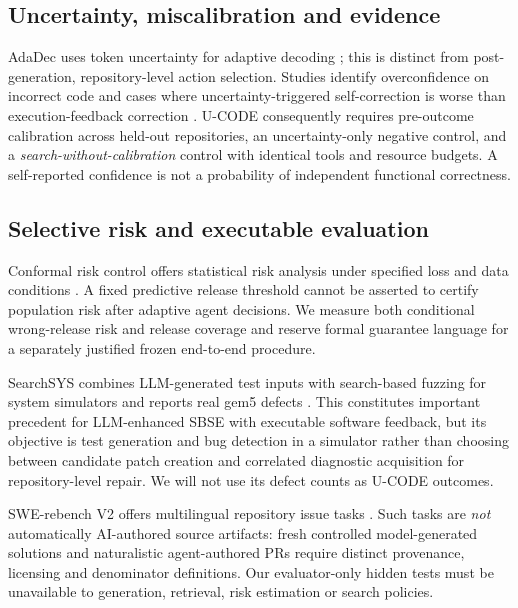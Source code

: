 \documentclass[pdflatex,sn-basic]{sn-jnl}
\begin{document}
\subsection{Uncertainty, miscalibration and evidence}
AdaDec uses token uncertainty for adaptive decoding
\cite{he2025adadec}; this is distinct from post-generation,
repository-level action selection. Studies identify overconfidence
on incorrect code \cite{rathnasuriya2026overconfidence} and
cases where uncertainty-triggered self-correction is worse than
execution-feedback correction \cite{rakasi2026uncertainty}.
U-CODE consequently requires pre-outcome calibration across held-out
repositories, an uncertainty-only negative control, and a
\emph{search-without-calibration} control with identical tools and
resource budgets. A self-reported confidence is not a probability
of independent functional correctness.

\subsection{Selective risk and executable evaluation}
Conformal risk control offers statistical risk analysis under
specified loss and data conditions \cite{angelopoulos2024crc}.
A fixed predictive release threshold cannot be asserted to
certify population risk after adaptive agent decisions. We measure
both conditional wrong-release risk and release coverage and reserve
formal guarantee language for a separately justified frozen
end-to-end procedure.

SearchSYS combines LLM-generated test inputs with
search-based fuzzing for system simulators and reports real
gem5 defects \cite{dakhama2025searchsys}. This constitutes
important precedent for LLM-enhanced SBSE with executable
software feedback, but its objective is test generation and
bug detection in a simulator rather than choosing
between candidate patch creation and correlated
diagnostic acquisition for repository-level repair.
We will not use its defect counts as U-CODE outcomes.

SWE-rebench V2 offers multilingual repository issue tasks
\cite{badertdinov2026swerebench}. Such tasks are \emph{not}
automatically AI-authored source artifacts: fresh controlled
model-generated solutions and naturalistic agent-authored PRs
require distinct provenance, licensing and denominator definitions.
Our evaluator-only hidden tests must be unavailable to
generation, retrieval, risk estimation or search policies.
\end{document}
